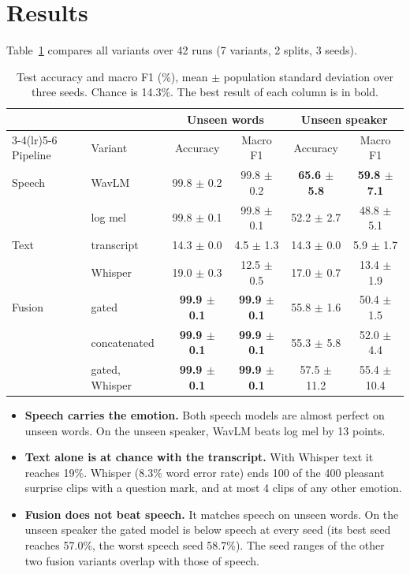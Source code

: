 \documentclass[11pt,a4paper]{article}
\begin{document}
\section{Results}

Table~\ref{tab:acc} compares all variants over 42 runs (7 variants, 2 splits, 3 seeds).

\begin{table}[htbp]
\centering\small
\caption{Test accuracy and macro F1 (\%), mean $\pm$ population standard deviation over three seeds. Chance is 14.3\%.
The best result of each column is in bold.}
\label{tab:acc}
\begin{tabular}{llcccc}
\toprule
& & \multicolumn{2}{c}{Unseen words} & \multicolumn{2}{c}{Unseen speaker} \\
\cmidrule(lr){3-4}\cmidrule(lr){5-6}
Pipeline & Variant & Accuracy & Macro F1 & Accuracy & Macro F1 \\
\midrule
Speech & WavLM & 99.8 $\pm$ 0.2 & 99.8 $\pm$ 0.2 & \textbf{65.6 $\pm$ 5.8} & \textbf{59.8 $\pm$ 7.1} \\
 & log mel & 99.8 $\pm$ 0.1 & 99.8 $\pm$ 0.1 & 52.2 $\pm$ 2.7 & 48.8 $\pm$ 5.1 \\
\midrule
Text & transcript & 14.3 $\pm$ 0.0 & 4.5 $\pm$ 1.3 & 14.3 $\pm$ 0.0 & 5.9 $\pm$ 1.7 \\
 & Whisper & 19.0 $\pm$ 0.3 & 12.5 $\pm$ 0.5 & 17.0 $\pm$ 0.7 & 13.4 $\pm$ 1.9 \\
\midrule
Fusion & gated & \textbf{99.9 $\pm$ 0.1} & \textbf{99.9 $\pm$ 0.1} & 55.8 $\pm$ 1.6 & 50.4 $\pm$ 1.5 \\
 & concatenated & \textbf{99.9 $\pm$ 0.1} & \textbf{99.9 $\pm$ 0.1} & 55.3 $\pm$ 5.8 & 52.0 $\pm$ 4.4 \\
 & gated, Whisper & \textbf{99.9 $\pm$ 0.1} & \textbf{99.9 $\pm$ 0.1} & 57.5 $\pm$ 11.2 & 55.4 $\pm$ 10.4 \\
\bottomrule
\end{tabular}
\end{table}

\begin{itemize}
\item \textbf{Speech carries the emotion.} Both speech models are almost perfect on unseen words. On the unseen speaker,
  WavLM beats log mel by 13 points.
\item \textbf{Text alone is at chance with the transcript.} With Whisper text it reaches 19\%. Whisper (8.3\% word error
  rate) ends 100 of the 400 pleasant surprise clips with a question mark, and at most 4 clips of any other emotion.
\item \textbf{Fusion does not beat speech.} It matches speech on unseen words. On the unseen speaker the gated model is
  below speech at every seed (its best seed reaches 57.0\%, the worst speech seed 58.7\%). The seed ranges of the other
  two fusion variants overlap with those of speech.
\end{itemize}
\end{document}

